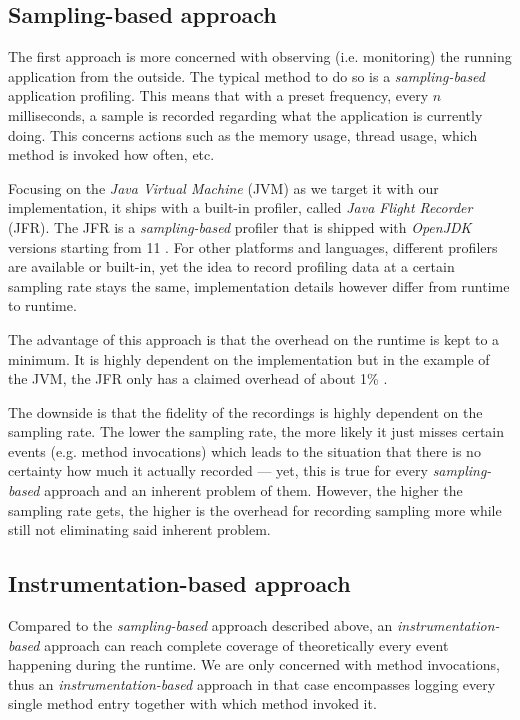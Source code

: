 \documentclass[12pt,a4paper]{report}
\begin{document}
\subsection{Sampling\hyp based approach}

The first approach is more concerned with observing (i.e. monitoring)
the running application from the outside. The typical method to do so is
a \textit{sampling\hyp based} application profiling. This means that with a preset
frequency, every \(n\) milliseconds, a sample is recorded regarding what the
application is currently doing. This concerns actions such as
the memory usage, thread usage, which method is invoked how often, etc.

Focusing on the \textit{Java Virtual Machine} (JVM) as we target it with our
implementation, it ships with a built-in profiler,
called \textit{Java Flight Recorder} (JFR).
The JFR is a \textit{sampling\hyp based} profiler that is shipped
with \textit{OpenJDK} versions starting from 11 \cite{openjdk-jfr}.
For other platforms and languages, different profilers are available or built-in,
yet the idea to record profiling data at a certain sampling rate
stays the same, implementation details however differ from runtime to runtime.

The advantage of this approach is that the overhead on the runtime is kept to
a minimum. It is highly dependent on the implementation but in the example of
the JVM, the JFR only has a claimed overhead of about 1\% \cite{openjdk-jfr}.

The downside is that the fidelity of the recordings is highly dependent on the
sampling rate. The lower the sampling rate, the more likely it just misses
certain events (e.g. method invocations) which leads to the situation that
there is no certainty how much it actually recorded --- yet, this is true
for every \textit{sampling\hyp based} approach and an inherent problem of them.
However, the higher the sampling rate gets, the higher is the overhead for
recording sampling more while still not eliminating said inherent problem.


\subsection{Instrumentation\hyp based approach}

Compared to the \textit{sampling\hyp based} approach described above,
an \textit{instrumentation\hyp based} approach can reach complete coverage of
theoretically every event happening during the runtime.
We are only concerned with method invocations, thus an
\textit{instrumentation\hyp based} approach in that case encompasses logging
every single method entry together with which method invoked it.
\end{document}
